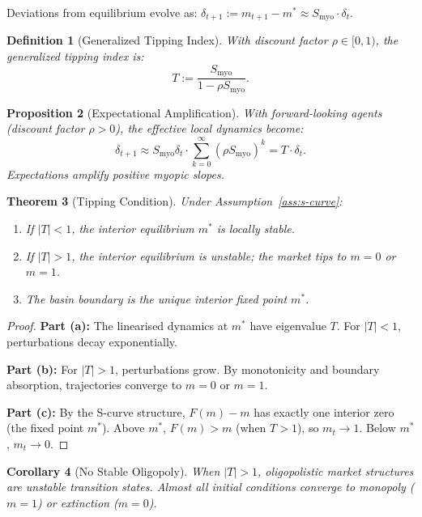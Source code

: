 \documentclass[12pt]{article}
\newtheorem{theorem}{Theorem}[section]
\newtheorem{proposition}[theorem]{Proposition}
\newtheorem{corollary}[theorem]{Corollary}
\newtheorem{definition}[theorem]{Definition}
\begin{document}
Deviations from equilibrium evolve as: $\delta_{t+1} := m_{t+1} - m^* \approx S_{\mathrm{myo}} \cdot \delta_t$.

\begin{definition}[Generalized Tipping Index]
\label{def:tipping-index}
With discount factor $\rho \in [0, 1)$, the \emph{generalized tipping index} is:
\[
T := \frac{S_{\mathrm{myo}}}{1 - \rho S_{\mathrm{myo}}}.
\]
\end{definition}

\begin{proposition}[Expectational Amplification]
\label{prop:expectational}
With forward-looking agents (discount factor $\rho > 0$), the effective local dynamics become:
\[
\delta_{t+1} \approx S_{\mathrm{myo}} \delta_t \cdot \sum_{k=0}^\infty (\rho S_{\mathrm{myo}})^k = T \cdot \delta_t.
\]
Expectations amplify positive myopic slopes.
\end{proposition}

\begin{theorem}[Tipping Condition]
\label{thm:tipping-condition}
Under Assumption~\ref{ass:s-curve}:
\begin{enumerate}
    \item[(a)] If $|T| < 1$, the interior equilibrium $m^*$ is locally stable.
    \item[(b)] If $|T| > 1$, the interior equilibrium is unstable; the market tips to $m = 0$ or $m = 1$.
    \item[(c)] The basin boundary is the unique interior fixed point $m^*$.
\end{enumerate}
\end{theorem}

\begin{proof}
\textbf{Part (a):} The linearised dynamics at $m^*$ have eigenvalue $T$. For $|T| < 1$, perturbations decay exponentially.

\textbf{Part (b):} For $|T| > 1$, perturbations grow. By monotonicity and boundary absorption, trajectories converge to $m = 0$ or $m = 1$.

\textbf{Part (c):} By the S-curve structure, $F(m) - m$ has exactly one interior zero (the fixed point $m^*$). Above $m^*$, $F(m) > m$ (when $T > 1$), so $m_t \to 1$. Below $m^*$, $m_t \to 0$.
\end{proof}

\begin{corollary}[No Stable Oligopoly]
\label{cor:no-oligopoly}
When $|T| > 1$, oligopolistic market structures are unstable transition states. Almost all initial conditions converge to monopoly ($m = 1$) or extinction ($m = 0$).
\end{corollary}
\end{document}
